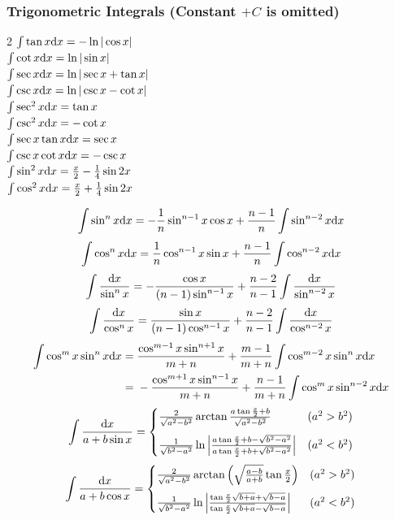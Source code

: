 \subsubsection*{Trigonometric Integrals (Constant $+C$ is omitted)}
\begin{multicols}{2}
    $\int \tan x \mathrm{d} x = -\ln|\cos x|$
    \\ $\int \cot x \mathrm{d} x = \ln |\sin x|$
    \\ $\int \sec x \mathrm{d} x = \ln |\sec x + \tan x|$
    \\ $\int \csc x \mathrm{d} x = \ln |\csc x - \cot x|$
    \\ $\int \sec^2 x \mathrm{d} x = \tan x$
    \\ $\int \csc^2 x \mathrm{d} x = -\cot x$
    \\ $\int \sec x \tan x \mathrm{d} x = \sec x$
    \\ $\int \csc x \cot x \mathrm{d} x = -\csc x$
    \\ $\int \sin^2 x \mathrm{d} x = \frac{x}{2} - \frac{1}{4} \sin 2x$
    \\ $\int \cos^2 x \mathrm{d} x = \frac{x}{2} + \frac{1}{4} \sin 2x$
\end{multicols}
\[ 
\int \sin^n x \mathrm{d} x = -\frac{1}{n} \sin^{n-1} x \cos x + \frac{n-1}{n} \int \sin^{n-2} x \mathrm{d} x 
\]
\[ 
\int \cos^n x \mathrm{d} x = \frac{1}{n} \cos^{n-1} x \sin x + \frac{n-1}{n} \int \cos^{n-2} x \mathrm{d} x 
\]
\[ 
\int \frac{\mathrm{d} x}{\sin^n x} = -\frac{\cos x}{(n-1)\sin^{n-1}x} + \frac{n-2}{n-1} \int \frac{\mathrm{d} x}{\sin^{n-2}x} 
\]
\[ 
\int \frac{\mathrm{d} x}{\cos^n x} = \frac{\sin x}{(n-1)\cos^{n-1}x} + \frac{n-2}{n-1} \int \frac{\mathrm{d} x}{\cos^{n-2}x} 
\]
\[ 
\begin{split} \int \cos^m x \sin^n x \mathrm{d} x 
    = {}& \frac{\cos^{m-1} x \sin^{n+1}x}{m+n} + \frac{m-1}{m+n}\int\cos^{m-2}x\sin^nx\mathrm{d} x \\
    = {}& -\frac{\cos^{m+1} x \sin^{n-1}x}{m+n} + \frac{n-1}{m+n} \int \cos^m x\sin^{n-2} x \mathrm{d} x 
\end{split} 
\]
\[ 
\int \frac{\mathrm{d} x}{a + b \sin x} = \begin{cases}
    \frac{2}{\sqrt{a^2-b^2}}\arctan\frac{a\tan\frac{x}{2}+b}{\sqrt{a^2-b^2}} & (a^2 > b^2) \\[2ex]
    \frac{1}{\sqrt{b^2-a^2}}\ln \left| \frac{a\tan\frac{x}{2}+b-\sqrt{b^2-a^2}}{a\tan\frac{x}{2}+b+\sqrt{b^2-a^2}} \right| & (a^2 < b^2)
    \end{cases} 
\]
\[ 
\int \frac{\mathrm{d} x}{a + b \cos x} = \begin{cases}
    \frac{2}{\sqrt{a^2-b^2}}\arctan\left(\sqrt{\frac{a-b}{a+b}}\tan\frac{x}{2}\right) & (a^2 > b^2) \\[2ex]
    \frac{1}{\sqrt{b^2-a^2}} \ln \left| \frac{\tan\frac{x}{2}\sqrt{b+a}+\sqrt{b-a}}{\tan\frac{x}{2}\sqrt{b+a}-\sqrt{b-a}} \right| & (a^2 < b^2)
    \end{cases} 
\]
